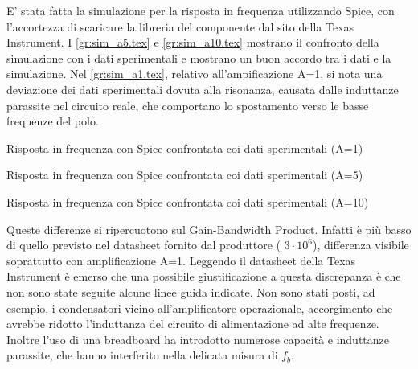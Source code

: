 E' stata fatta la simulazione per la risposta in frequenza utilizzando Spice, con l'accortezza di scaricare la libreria del componente
dal sito della Texas Instrument.
I  \autoref{gr:sim_a5.tex} e \autoref{gr:sim_a10.tex} mostrano il confronto della simulazione con 
i dati sperimentali e mostrano un buon accordo tra i dati e la simulazione.
Nel \autoref{gr:sim_a1.tex}, relativo all'ampificazione A=1, si nota una deviazione dei dati sperimentali dovuta alla risonanza,
causata dalle induttanze parassite nel circuito reale, che comportano lo spostamento verso le basse frequenze del polo.

\begin{grafico}
 \centering
 \resizebox{\textwidth}{!}{%
 
 }%
 \caption{Risposta in frequenza con Spice confrontata coi dati sperimentali (A=1)} 
 \label{gr:sim_a1.tex} 
\end{grafico}

\begin{grafico}
 \centering
 \resizebox{\textwidth}{!}{%
 
 }%
 \caption{Risposta in frequenza con Spice confrontata coi dati sperimentali (A=5)} 
 \label{gr:sim_a5.tex} 
\end{grafico}

\begin{grafico}
 \centering
 \resizebox{\textwidth}{!}{%
 
 }%
 \caption{Risposta in frequenza con Spice confrontata coi dati sperimentali (A=10)} 
 \label{gr:sim_a10.tex} 
\end{grafico}

Queste differenze si ripercuotono sul Gain-Bandwidth Product. Infatti è più basso di quello previsto nel datasheet fornito dal 
produttore ( $3 \cdot 10^{6}$), differenza visibile soprattutto con amplificazione A=1.
Leggendo il datasheet della Texas Instrument è emerso che una possibile giustificazione a questa discrepanza è che non sono state
seguite alcune linee guida indicate. Non sono stati posti, ad esempio, i condensatori vicino all'amplificatore operazionale,
accorgimento che avrebbe ridotto l'induttanza del circuito di alimentazione ad alte frequenze.
Inoltre l'uso di una breadboard ha introdotto numerose capacità e induttanze parassite, che hanno interferito nella delicata
misura di $f_b$.



